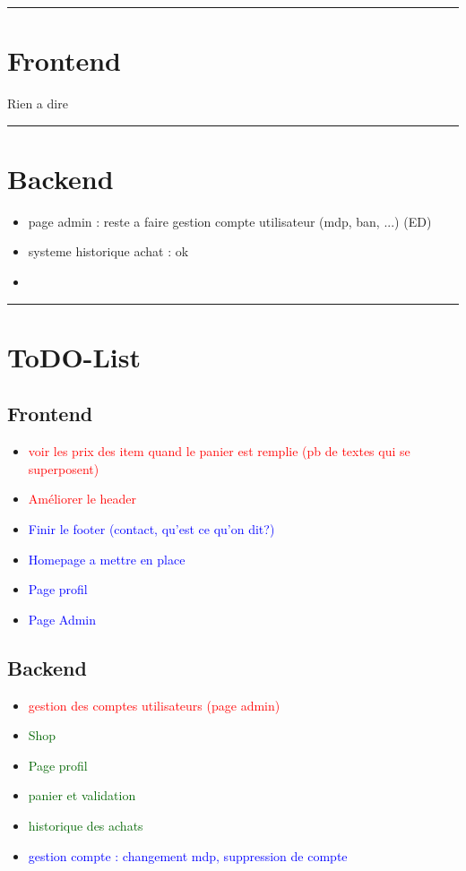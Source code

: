 \documentclass[10pt,a4paper]{report}
\begin{document}
\noindent\rule{\linewidth}{0.5mm} \bigskip
\section{Frontend}
Rien a dire


\noindent\rule{\linewidth}{0.5mm} \bigskip
\section{Backend}

\begin{itemize}
        \item page admin : reste a faire gestion compte utilisateur (mdp, ban, ...) (ED)
        \item systeme historique achat : ok 
        \item 
\end{itemize}


\noindent\rule{\linewidth}{0.5mm} \bigskip
\section{ToDO-List}
\subsection*{Frontend}
\begin{itemize}
        \item \textcolor{red}{voir les prix des item quand le panier est remplie (pb de textes qui se superposent)}
        \item \textcolor{red}{Améliorer le header}
        \item \textcolor{blue}{Finir le footer (contact, qu’est ce qu’on dit?)}
        \item \textcolor{blue}{Homepage a mettre en place}
        \item \textcolor{blue}{Page profil}
        \item \textcolor{blue}{Page Admin}
\end{itemize}

\subsection*{Backend}
\begin{itemize}
        \item \textcolor{red}{gestion des comptes utilisateurs (page admin)}
        \item \textcolor{darkgreen}{Shop}
        \item \textcolor{darkgreen}{Page profil}
        \item \textcolor{darkgreen}{panier et validation}
        \item \textcolor{darkgreen}{historique des achats}
        \item \textcolor{blue}{gestion compte : changement mdp, suppression de compte}
\end{itemize}
\end{document}
